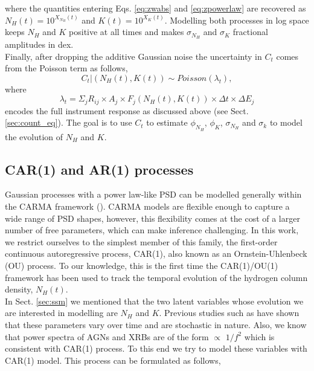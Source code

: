 \documentclass{aa}
\begin{document}
where the quantities entering Eqs. \ref{eq:zwabs} and \ref{eq:zpowerlaw} are
recovered as $N_H(t) = 10^{X_{N_H}(t)}$ and $K(t) = 10^{X_K(t)}$. Modelling both
processes in log space keeps $N_H$ and $K$ positive at all times and makes
$\sigma_{N_H}$ and $\sigma_K$ fractional amplitudes in dex. \\
Finally, after dropping the additive Gaussian noise the uncertainty in $C_t$ comes from the Poisson term as follows,
\begin{equation}
C_t|(N_H(t), K(t)) \sim Poisson(\lambda_t),
\label{eq:ssm_condition}
\end{equation}
where
\begin{equation}
\lambda_t = \Sigma_j R_{ij}\times A_j \times F_j(N_H(t), K(t)) \times \Delta t \times \Delta E_j
\label{eq:ssm_Gt}
\end{equation}
encodes the full instrument response as discussed above (see Sect. \ref{sec:count_eq}). The goal is to use $C_t$ to estimate $\phi_{N_H}$, $\phi_K$, $\sigma_{N_H}$ and $\sigma_k$ to model the evolution of $N_H$ and $K$.

\subsection{CAR(1) and AR(1) processes}
\label{sec:car_ar}
Gaussian processes with a power law-like PSD can be modelled generally within the CARMA framework (\citealt{Kelly2014}). CARMA models are flexible enough
to capture a wide range of PSD shapes, however, this flexibility comes at the cost of a larger number of
free parameters, which can make inference challenging. In this work, we restrict ourselves to the
simplest member of this family, the first-order continuous autoregressive process, CAR(1), also known
as an Ornstein-Uhlenbeck (OU) process. To our knowledge, this is the first time the CAR(1)/OU(1)
framework has been used to track the temporal evolution of the hydrogen column density, $N_H(t)$. \\
In Sect. \ref{sec:ssm} we mentioned that the two latent variables whose evolution we are interested in
modelling are $N_H$ and $K$. Previous studies such as \citet{Risaliti2002} have shown that these
parameters vary over time and are stochastic in nature. Also, we know that power spectra of AGNs and
XRBs are of the form $\propto$ $1/f^2$ which is consistent with CAR(1) process. To this end we try to model these
variables with CAR(1) model. This process can be formulated as follows,
\end{document}
